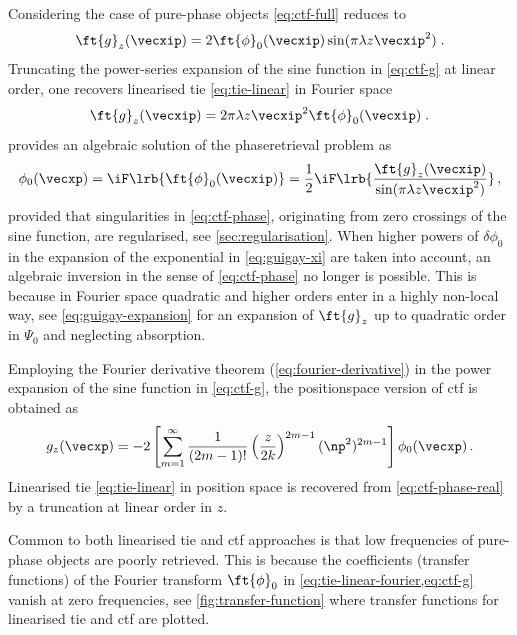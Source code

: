 \documentclass[
twoside,
openright,
titlepage,
numbers=noenddot,
headinclude,
fleqn,
a4paper,
footinclude=true,
cleardoublepage=empty,
abstractoff,
BCOR=5mm,
paper=a4,
fontsize=11pt,
british,ngerman,american,
]{scrreprt}
\begin{document}
Considering the case of pure-phase objects \cref{eq:ctf-full} reduces
to
\begin{equation}
  \label{eq:ctf-g}
    \ft{g}_z(\vecxip) =
     2\ft{\phi}_0(\vecxip)\sin(\pi\lambda z\vecxip^2) \;.
\end{equation}
Truncating the power-series expansion of the sine function in
\cref{eq:ctf-g} at linear order, one recovers linearised \ac{tie}
\eqref{eq:tie-linear} in Fourier space 
\begin{equation}
  \label{eq:tie-linear-fourier}
  \ft{g}_z(\vecxip) =
  2\pi\lambda z \vecxip^{2} \ft{\phi}_0(\vecxip) \;.
\end{equation}
  provides an
algebraic solution of the phase\hyph retrieval problem as
\begin{equation}
  \label{eq:ctf-phase}
    \phi_0(\vecxp) = \iF\lrb{ \ft{\phi}_0(\vecxip) } = 
    \frac12\iF\lrb{\frac{\ft{g}_z(\vecxip)}
      {\sin(\pi\lambda z\vecxip^2)}} \,,
\end{equation}
provided that singularities in \cref{eq:ctf-phase}, originating from
zero crossings of the sine function, are regularised, see
\cref{sec:regularisation}.  When higher powers of $\delta\phi_0$ in
the expansion of the exponential in \cref{eq:guigay-xi} are taken into
account, an algebraic inversion in the sense of \cref{eq:ctf-phase} no
longer is possible.  This is because in Fourier space quadratic and
higher orders enter in a highly non-local way, see
\cref{eq:guigay-expansion} for an expansion of $\ft{g}_z$ up to
quadratic order in $\Psi_0$ and neglecting absorption.

Employing the Fourier derivative theorem
(\cref{eq:fourier-derivative}) in the power expansion of the sine
function in \cref{eq:ctf-g}, the position\hyph space version of
\ac{ctf} is obtained as
\begin{equation}
  \label{eq:ctf-phase-real}
  g_{z}(\vecxp) = 
  -2\left[\sum^\infty_{m=1}\frac{1}{(2 m-1)!}
    \left(\frac{z}{2 k}\right)^{2 m-1}
    (\np^2)^{2 m-1}\right]\phi_0(\vecxp) \,.
\end{equation}
 Linearised \ac{tie} \eqref{eq:tie-linear} in position space is
recovered from \cref{eq:ctf-phase-real} by a truncation at linear
order in $z$.


Common to both linearised \ac{tie} and \ac{ctf} approaches is that low
frequencies of pure-phase objects are poorly retrieved.  This is
because the coefficients (transfer functions) of the Fourier transform
$\ft{\phi}_0$ in \cref{eq:tie-linear-fourier,eq:ctf-g} vanish at zero
frequencies, see \cref{fig:transfer-function} where  transfer
functions for linearised \ac{tie} and \ac{ctf} are plotted.
\end{document}
